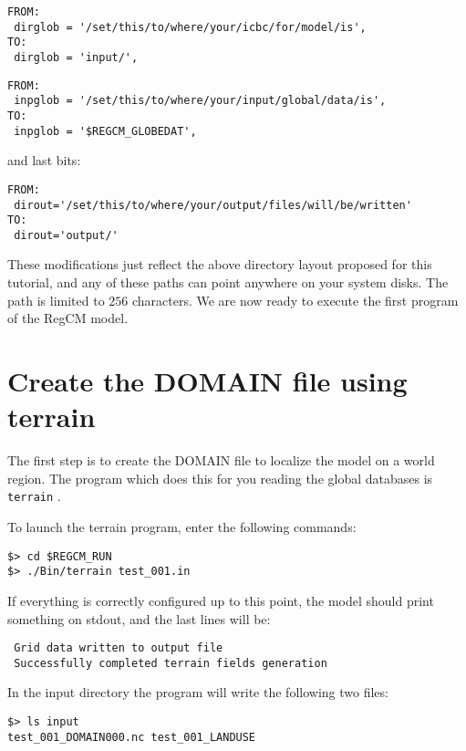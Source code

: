 \begin{Verbatim}
FROM:
 dirglob = '/set/this/to/where/your/icbc/for/model/is',
TO:
 dirglob = 'input/',
\end{Verbatim}

\begin{Verbatim}
FROM:
 inpglob = '/set/this/to/where/your/input/global/data/is',
TO:
 inpglob = '$REGCM_GLOBEDAT',
\end{Verbatim}

and last bits:

\begin{Verbatim}
FROM:
 dirout='/set/this/to/where/your/output/files/will/be/written'
TO:
 dirout='output/'
\end{Verbatim}

These modifications just reflect the above directory layout proposed for this
tutorial, and any of these paths can point anywhere on your system disks. The path
is limited to $256$ characters.
We are now ready to execute the first program of the RegCM model.

\section{Create the DOMAIN file using terrain}

The first step is to create the DOMAIN file to localize the model on a world region.
The program which does this for you reading the global databases is
\verb=terrain= .

To launch the terrain program, enter the following commands:

\begin{Verbatim}
$> cd $REGCM_RUN
$> ./Bin/terrain test_001.in
\end{Verbatim}

If everything is correctly configured up to this point, the model should print
something on stdout, and the last lines will be:

\begin{Verbatim}
 Grid data written to output file                                               
 Successfully completed terrain fields generation
\end{Verbatim}

In the input directory the program will write the following two files:

\begin{Verbatim}
$> ls input
test_001_DOMAIN000.nc test_001_LANDUSE
\end{Verbatim}

